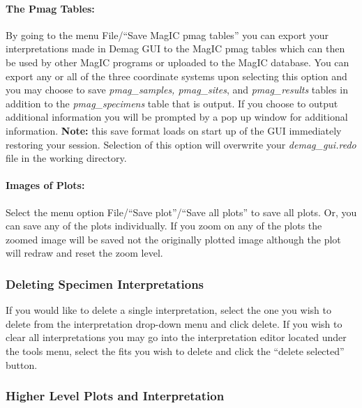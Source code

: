 \documentclass[11pt]{book}
\begin{document}
\paragraph{The Pmag Tables:}\label{the-pmag-tables}

By going to the menu File/``Save MagIC pmag tables'' you can export your interpretations made in Demag GUI to the MagIC pmag tables which can then be used by other MagIC programs or uploaded to the MagIC database. You can export any or all of the three coordinate systems upon selecting this option and you may choose to save {\it pmag\_samples, pmag\_sites}, and {\it pmag\_results}  tables in addition to the {\it pmag\_specimens } table that is output. If you choose to output additional information you will be prompted by a pop up window for additional information. \textbf{Note:} this save format loads on start up of the GUI immediately restoring your session. Selection of this option will overwrite your {\it demag\_gui.redo} file in the working directory.

\paragraph{Images of Plots:}\label{images-of-plots}

Select the menu option File/``Save plot''/``Save all plots'' to save all plots. Or, you can save any of the plots individually. If you zoom on any of the plots the zoomed image will be saved not the originally plotted image although the plot will redraw and reset the zoom level.

\subsubsection{Deleting Specimen
Interpretations}\label{deleting-specimen-interpretations}

If you would like to delete a single interpretation, select the one you wish to delete from the interpretation drop-down menu and click delete. If you wish to clear all interpretations you may go into the interpretation editor located under the tools menu, select the fits you wish to delete and click the ``delete selected'' button.\\

\subsubsection{Higher Level Plots and
Interpretation}\label{higher-level-plots-and-interpretation}
\end{document}
